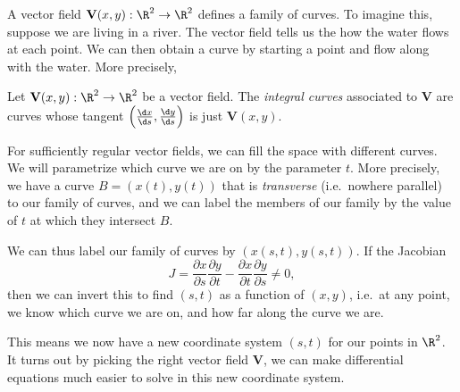 \documentclass[a4paper]{article}
\begin{document}
A vector field $\mathbf{V}(x, y): \R^2 \to \R^2$ defines a family of curves. To imagine this, suppose we are living in a river. The vector field tells us the how the water flows at each point. We can then obtain a curve by starting a point and flow along with the water. More precisely,
\begin{defi}
  Let $\mathbf{V}(x, y): \R^2 \to \R^2$ be a vector field. The \emph{integral curves} associated to $\mathbf{V}$ are curves whose tangent $\left(\frac{\d x}{\d s}, \frac{\d y}{\d s}\right)$ is just $\mathbf{V}(x, y)$.
\end{defi}
For sufficiently regular vector fields, we can fill the space with different curves. We will parametrize which curve we are on by the parameter $t$. More precisely, we have a curve $B = (x(t), y(t))$ that is \emph{transverse} (i.e.\ nowhere parallel) to our family of curves, and we can label the members of our family by the value of $t$ at which they intersect $B$.
\begin{center}
\end{center}
We can thus label our family of curves by $(x(s, t), y(s, t))$. If the Jacobian
\[
  J = \frac{\partial x}{\partial s} \frac{\partial y}{\partial t} - \frac{\partial x}{\partial t} \frac{\partial y}{\partial s} \not= 0,
\]
then we can invert this to find $(s, t)$ as a function of $(x, y)$, i.e.\ at any point, we know which curve we are on, and how far along the curve we are.

This means we now have a new coordinate system $(s, t)$ for our points in $\R^2$. It turns out by picking the right vector field $\mathbf{V}$, we can make differential equations much easier to solve in this new coordinate system.
\end{document}
